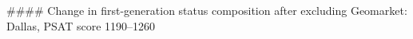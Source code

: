 #### Change in first-generation status composition after excluding Geomarket: Dallas, PSAT score 1190–1260
